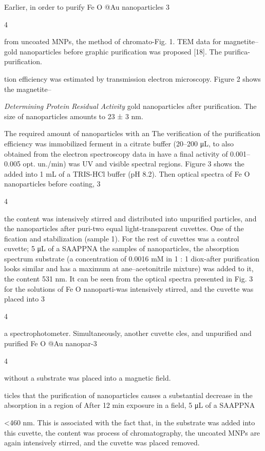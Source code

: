 \documentclass[12pt,a4paper]{article}
\begin{document}
Earlier, in order to purify Fe O @Au nanoparticles 3

4

from uncoated MNPs, the method of chromato-Fig. 1. TEM data for
magnetite--gold nanoparticles before graphic purification was proposed
{[}18{]}. The purifica-purification.

tion efficiency was estimated by transmission electron microscopy.
Figure 2 shows the magnetite--

\emph{Determining Protein Residual Activity} gold nanoparticles after
purification. The size of nanoparticles amounts to 23 ± 3 nm.

The required amount of nanoparticles with an The verification of the
purification efficiency was immobilized ferment in a citrate buffer
(20--200 μL, to also obtained from the electron spectroscopy data in
have a final activity of 0.001--0.005 opt. un./min) was UV and visible
spectral regions. Figure 3 shows the added into 1 mL of a TRIS-HCl
buffer (pH 8.2). Then optical spectra of Fe O nanoparticles before
coating, 3

4

the content was intensively stirred and distributed into unpurified
particles, and the nanoparticles after puri-two equal light-transparent
cuvettes. One of the fication and stabilization (sample 1). For the rest
of cuvettes was a control cuvette; 5 μL of a SAAPPNA the samples of
nanoparticles, the absorption spectrum substrate (a concentration of
0.0016 mM in 1 : 1 diox-after purification looks similar and has a
maximum at ane--acetonitrile mixture) was added to it, the content 531
nm. It can be seen from the optical spectra presented in Fig. 3 for the
solutions of Fe O nanoparti-was intensively stirred, and the cuvette was
placed into 3

4

a spectrophotometer. Simultaneously, another cuvette cles, and
unpurified and purified Fe O @Au nanopar-3

4

without a substrate was placed into a magnetic field.

ticles that the purification of nanoparticles causes a substantial
decrease in the absorption in a region of After 12 min exposure in a
field, 5 μL of a SAAPPNA

\textless460 nm. This is associated with the fact that, in the substrate
was added into this cuvette, the content was process of chromatography,
the uncoated MNPs are again intensively stirred, and the cuvette was
placed removed.
\end{document}
